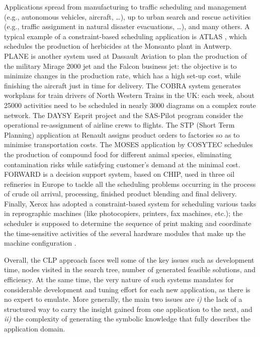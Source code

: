 \documentclass[12pt,a4paper,openright,twoside]{book}
\begin{document}
Applications spread from manufacturing to traffic scheduling and management (e.g., autonomous vehicles, aircraft, \ldots), up to urban search and rescue activities (e.g., traffic assignment in natural disaster evacuations, \ldots), and many others.
%
A typical example of a constraint-based scheduling application is ATLAS \cite{akbarinia2006}, which schedules the production of herbicides at the Monsanto plant in Antwerp.
%
PLANE \cite{Simonis2001} is another system used at Dassault Aviation to plan the production of the military Mirage 2000 jet and the Falcon business jet: the objective is to minimize changes in the production rate, which has a high set-up cost, while finishing the aircraft just in time for delivery.
%
The COBRA system \cite{Simonis2001} generates workplans for train drivers of North Western Trains in the UK: each week, about 25000 activities need to be scheduled in nearly 3000 diagrams on a complex route network.
%
The DAYSY Esprit project \cite{simonis2000} and the SAS-Pilot program \cite{baues1994} consider the operational re-assignment of airline crews to flights.
%
The STP (Short Term Planning) application at Renault \cite{wallace1996} assigns product orders to factories so as to minimise transportation costs.
%
The MOSES application by COSYTEC \cite{wallace1996} schedules the production of compound food for different animal species, eliminating contamination risks while satisfying customer's demand at the minimal cost.
%
FORWARD \cite{simonis1995} is a decision support system, based on CHIP, used in three oil refineries in Europe to tackle all the scheduling problems occurring in the process of crude oil arrival, processing, finished product blending and final delivery.
%
Finally, Xerox has adopted a constraint-based system for scheduling various tasks in reprographic machines (like photocopiers, printers, fax machines, etc.); the scheduler is supposed to determine the sequence of print making and coordinate the time-sensitive activities of the several hardware modules that make up the machine configuration \cite{bistarelli2001}.

Overall, the CLP approach faces well some of the key issues such as development time, nodes visited in the search tree, number of generated feasible solutions, and efficiency.
%
At the same time, the very nature of such systems mandates for considerable development and tuning effort for each new application, as there is no expert to emulate.
%
More generally, the main two issues are \emph{i)} the lack of a structured way to carry the insight gained from one application to the next, and \emph{ii)} the complexity of generating the symbolic knowledge that fully describes the application domain.
\end{document}
